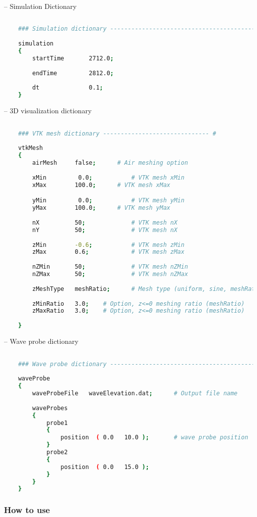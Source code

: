 	-- Simulation Dictionary
		
	\begin{lstlisting}[language=bash]
	
	### Simulation dictionary ------------------------------------------- #
	
	simulation
	{
		startTime		2712.0;
	
		endTime			2812.0;
	
		dt	     		0.1;
	}	
	\end{lstlisting}
	
	-- 3D visualization dictionary
	
	\begin{lstlisting}[language=bash]
	
	### VTK mesh dictionary ------------------------------ #
	
	vtkMesh
	{
		airMesh		false;		# Air meshing option 
		
		xMin		 0.0;			# VTK mesh xMin
		xMax		100.0;		# VTK mesh xMax

		yMin		 0.0;			# VTK mesh yMin
		yMax		100.0;		# VTK mesh yMax		
		
		nX			50;				# VTK mesh nX
		nY			50;				# VTK mesh nX
		
		zMin		-0.6;			# VTK mesh zMin		
		zMax		0.6;			# VTK mesh zMax
		
		nZMin		50;				# VTK mesh nZMin
		nZMax		50;				# VTK mesh nZMax
		
		zMeshType	meshRatio;		# Mesh type (uniform, sine, meshRatio)
		
		zMinRatio	3.0;	# Option, z<=0 meshing ratio (meshRatio)
		zMaxRatio	3.0;	# Option, z<=0 meshing ratio (meshRatio)
		
	}
	\end{lstlisting}
	
	\pagebreak
	
	-- Wave probe dictionary
	
	\begin{lstlisting}[language=bash]
	
	### Wave probe dictionary ------------------------------------------ #
	
	waveProbe
	{
		waveProbeFile	waveElevation.dat;		# Output file name
		
		waveProbes
		{
			probe1
			{
				position  ( 0.0   10.0 );		# wave probe position
			}			
			probe2
			{
				position  ( 0.0   15.0 );
			}			
		}
	}
	\end{lstlisting}
	
	\subsubsection{How to use}
	
